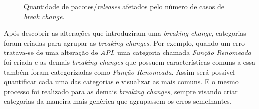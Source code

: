 \begin {figure} [h!]
{        
    }
    \caption{Quantidade de pacotes/\textit{releases} afetados pelo número de casos de \textit{break change}.}
    \label{fig:result_rq1_once_twice_three}
\end{figure}

Após descobrir as alterações que introduziram uma \textit{breaking change}, categorias foram criadas para agrupar as \textit{breaking changes}. Por exemplo, quando um erro tratava-se de uma alteração de \textit{API}, uma categoria chamada \textit{Função Renomeada} foi criada e as demais \textit{breaking changes} que possuem características comuns a essa também foram categorizadas como \textit{Função Renomeada}. Assim será possível quantificar cada uma das categorias e visualizar as mais comuns. E o mesmo processo foi realizado para as demais \textit{breaking changes}, sempre visando criar categorias da maneira mais genérica que agrupassem os erros semelhantes.

